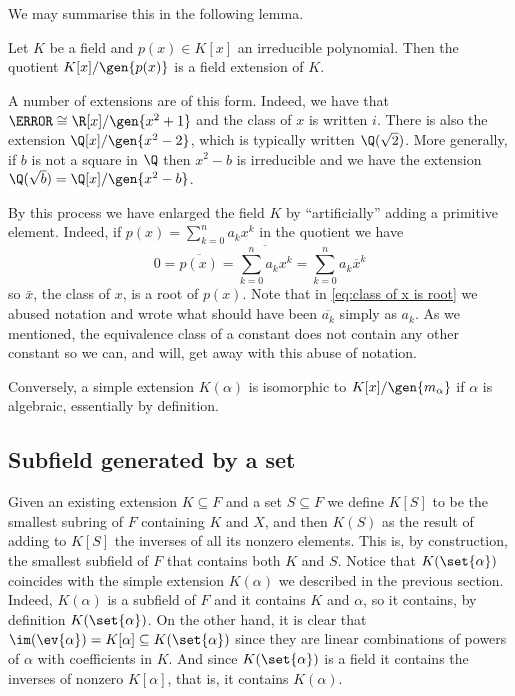 \documentclass[12pt,oneside]{book}
\begin{document}
We may summarise this in the following lemma.
\begin{lemma}
	Let \( K \) be a field and \( p(x) \in K[x] \) an irreducible polynomial. Then the
	quotient \( K[x]/\gen{p(x)}  \) is a field extension of \( K \).
\end{lemma}

A number of extensions are of this form. Indeed, we have that \( \C \cong \R[x]/\gen{x^2 +
1} \) and the class of \( x \) is written \( i \). There is also the extension \(
\Q[x]/\gen{x^2 - 2} \), which is typically written \( \Q(\sqrt{2}) \). More generally, if
\( b \) is not a square in \( \Q \) then \( x^2 - b \) is irreducible and we have the
extension \( \Q(\sqrt{b}) = \Q[x]/\gen{x^2 - b} \).

By this process we have enlarged the field \( K \) by ``artificially'' adding a primitive
element. Indeed, if \( p(x) = \sum_{k = 0}^{n}a_k x^k  \) in the quotient we
have
\begin{equation}\label{eq:class of x is root}
	0 = \overline{p(x)} = \overline{\sum_{k = 0}^{n}a_k x^k } = \sum_{k = 0}^{n} a_k
	\overline{x}^k 
\end{equation}
so \( \bar{x} \), the class of \( x \), is a root of \( p(x) \). Note that in
\cref{eq:class of x is root} we abused notation and wrote what should have been \(
\overline{a_k} \) simply as \( a_k \). As we mentioned, the equivalence class of a
constant does not contain any other constant so we can, and will, get away with this abuse of
notation.

Conversely, a simple extension \( K(\alpha) \) is isomorphic to \(
K[x]/\gen{m_{\alpha}} \) if \( \alpha \) is algebraic, essentially by definition.

\subsection{Subfield generated by a set} \label{sec:generated subfield}
Given an existing extension \( K \subseteq F \) and a set \( S \subseteq F \) we define \(
K[S] \) to be the smallest subring of \( F \) containing \( K \) and \( X \), and then \(
K(S) \) as the result of adding to \( K[S] \) the inverses of all its nonzero elements.
This is, by construction, the smallest subfield of \( F \) that contains both \( K \) and
\( S \). Notice that \( K(\set{\alpha}) \) coincides with the simple extension \( K(\alpha) \) we
described in the previous section. Indeed, \( K(\alpha) \) is a subfield of \( F \) and
it contains \( K \) and \( \alpha \), so it contains, by definition \( K(\set{\alpha}) \).
On the other hand, it is clear that \( \im(\ev{\alpha}) = K[\alpha] \subseteq
K(\set{\alpha}) \) since they are linear combinations of powers of \( \alpha \) with
coefficients in \( K \). And since \( K(\set{\alpha}) \) is a field it contains the
inverses of nonzero \( K[\alpha] \), that is, it contains \( K(\alpha) \).
\end{document}
